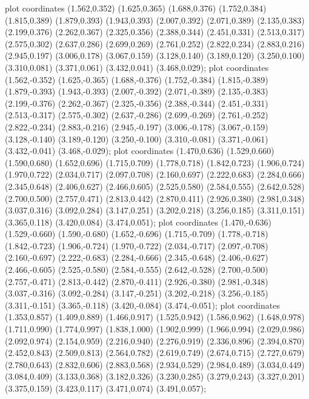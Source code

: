  plot coordinates {(1.562,0.352) (1.625,0.365) (1.688,0.376) (1.752,0.384) (1.815,0.389) (1.879,0.393) (1.943,0.393) (2.007,0.392) (2.071,0.389) (2.135,0.383) (2.199,0.376) (2.262,0.367) (2.325,0.356) (2.388,0.344) (2.451,0.331) (2.513,0.317) (2.575,0.302) (2.637,0.286) (2.699,0.269) (2.761,0.252) (2.822,0.234) (2.883,0.216) (2.945,0.197) (3.006,0.178) (3.067,0.159) (3.128,0.140) (3.189,0.120) (3.250,0.100) (3.310,0.081) (3.371,0.061) (3.432,0.041) (3.468,0.029)};
 plot coordinates {(1.562,-0.352) (1.625,-0.365) (1.688,-0.376) (1.752,-0.384) (1.815,-0.389) (1.879,-0.393) (1.943,-0.393) (2.007,-0.392) (2.071,-0.389) (2.135,-0.383) (2.199,-0.376) (2.262,-0.367) (2.325,-0.356) (2.388,-0.344) (2.451,-0.331) (2.513,-0.317) (2.575,-0.302) (2.637,-0.286) (2.699,-0.269) (2.761,-0.252) (2.822,-0.234) (2.883,-0.216) (2.945,-0.197) (3.006,-0.178) (3.067,-0.159) (3.128,-0.140) (3.189,-0.120) (3.250,-0.100) (3.310,-0.081) (3.371,-0.061) (3.432,-0.041) (3.468,-0.029)};
 plot coordinates {(1.470,0.636) (1.529,0.660) (1.590,0.680) (1.652,0.696) (1.715,0.709) (1.778,0.718) (1.842,0.723) (1.906,0.724) (1.970,0.722) (2.034,0.717) (2.097,0.708) (2.160,0.697) (2.222,0.683) (2.284,0.666) (2.345,0.648) (2.406,0.627) (2.466,0.605) (2.525,0.580) (2.584,0.555) (2.642,0.528) (2.700,0.500) (2.757,0.471) (2.813,0.442) (2.870,0.411) (2.926,0.380) (2.981,0.348) (3.037,0.316) (3.092,0.284) (3.147,0.251) (3.202,0.218) (3.256,0.185) (3.311,0.151) (3.365,0.118) (3.420,0.084) (3.474,0.051)};
 plot coordinates {(1.470,-0.636) (1.529,-0.660) (1.590,-0.680) (1.652,-0.696) (1.715,-0.709) (1.778,-0.718) (1.842,-0.723) (1.906,-0.724) (1.970,-0.722) (2.034,-0.717) (2.097,-0.708) (2.160,-0.697) (2.222,-0.683) (2.284,-0.666) (2.345,-0.648) (2.406,-0.627) (2.466,-0.605) (2.525,-0.580) (2.584,-0.555) (2.642,-0.528) (2.700,-0.500) (2.757,-0.471) (2.813,-0.442) (2.870,-0.411) (2.926,-0.380) (2.981,-0.348) (3.037,-0.316) (3.092,-0.284) (3.147,-0.251) (3.202,-0.218) (3.256,-0.185) (3.311,-0.151) (3.365,-0.118) (3.420,-0.084) (3.474,-0.051)};
 plot coordinates {(1.353,0.857) (1.409,0.889) (1.466,0.917) (1.525,0.942) (1.586,0.962) (1.648,0.978) (1.711,0.990) (1.774,0.997) (1.838,1.000) (1.902,0.999) (1.966,0.994) (2.029,0.986) (2.092,0.974) (2.154,0.959) (2.216,0.940) (2.276,0.919) (2.336,0.896) (2.394,0.870) (2.452,0.843) (2.509,0.813) (2.564,0.782) (2.619,0.749) (2.674,0.715) (2.727,0.679) (2.780,0.643) (2.832,0.606) (2.883,0.568) (2.934,0.529) (2.984,0.489) (3.034,0.449) (3.084,0.409) (3.133,0.368) (3.182,0.326) (3.230,0.285) (3.279,0.243) (3.327,0.201) (3.375,0.159) (3.423,0.117) (3.471,0.074) (3.491,0.057)};
